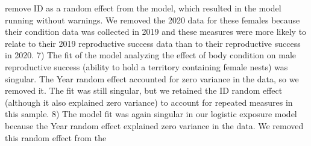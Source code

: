 \documentclass[
]{article}
\begin{document}
{{remove ID as a random effect from the model, which resulted in the model
running without warnings. We removed the 2020 data for these females
because their condition data was collected in 2019 and these measures
were more likely to relate to their 2019 reproductive success data than
to their reproductive success in 2020. 7) The fit of the model analyzing
the effect of body condition on male reproductive success (ability to
hold a territory containing female nests) was singular. The Year random
effect accounted for zero variance in the data, so we removed it. The
fit was still singular, but we retained the ID random effect (although
it also explained zero variance) to account for repeated measures in
this sample. 8) The model fit was again singular in our logistic
exposure model because the Year random effect explained zero variance in
the data. We removed this random effect from the
}}
\end{document}
